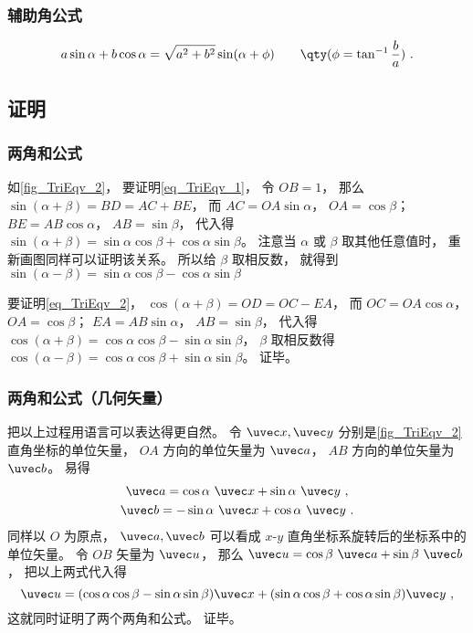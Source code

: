 \subsubsection{辅助角公式}
\begin{equation}
a\sin \alpha + b\cos \alpha = \sqrt{a^2+b^2}\sin(\alpha + \phi) \qquad \qty(\phi = \tan^{-1}\frac{b}{a})~.
\end{equation}

\subsection{证明}
\subsubsection{两角和公式}

如\autoref{fig_TriEqv_2}， 要证明\autoref{eq_TriEqv_1}， 令 $OB = 1$， 那么 $\sin(\alpha+\beta) = BD = AC + BE$， 而 $AC = OA \sin\alpha$， $OA = \cos\beta$； $BE = AB\cos\alpha$， $AB = \sin\beta$， 代入得 $\sin(\alpha+\beta) = \sin\alpha\cos\beta + \cos\alpha\sin\beta$。 注意当 $\alpha$ 或 $\beta$ 取其他任意值时， 重新画图同样可以证明该关系。 所以给 $\beta$ 取相反数， 就得到 $\sin(\alpha-\beta) = \sin\alpha\cos\beta - \cos\alpha\sin\beta$

要证明\autoref{eq_TriEqv_2}， $\cos(\alpha+\beta) = OD = OC - EA$， 而 $OC = OA\cos\alpha$， $OA = \cos\beta$； $EA = AB\sin\alpha$， $AB = \sin\beta$， 代入得 $\cos(\alpha+\beta) = \cos\alpha\cos\beta - \sin\alpha\sin\beta$， $\beta$ 取相反数得 $\cos(\alpha-\beta) = \cos\alpha\cos\beta + \sin\alpha\sin\beta$。 证毕。

\subsubsection{两角和公式（几何矢量）}
把以上过程用语言可以表达得更自然。 令 $\uvec x, \uvec y$ 分别是\autoref{fig_TriEqv_2} 直角坐标的单位矢量， $OA$ 方向的单位矢量为 $\uvec a$， $AB$ 方向的单位矢量为 $\uvec b$。 易得
\begin{gather}
\uvec a = \cos\alpha\ \uvec x + \sin\alpha\ \uvec y~,\\
\uvec b = -\sin\alpha\ \uvec x + \cos\alpha\ \uvec y~.
\end{gather}
同样以 $O$ 为原点， $\uvec a, \uvec b$ 可以看成 $x$-$y$ 直角坐标系旋转后的坐标系中的单位矢量。 令 $OB$ 矢量为 $\uvec u$， 那么 $\uvec u = \cos\beta\ \uvec a + \sin\beta\ \uvec b$， 把以上两式代入得
\begin{equation}
\uvec u = (\cos\alpha\cos\beta - \sin\alpha\sin\beta)\uvec x + (\sin\alpha\cos\beta + \cos\alpha\sin\beta)\uvec y~,
\end{equation}
这就同时证明了两个两角和公式。 证毕。

